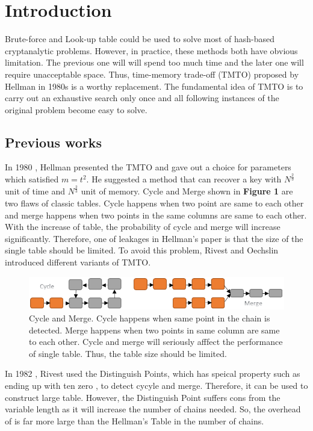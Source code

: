 \documentclass[runningheads,a4paper]{llncs}
\begin{document}
\section{Introduction}

Brute-force and Look-up table \cite{borst1998time} could be used to solve most of hash-based \cite{rogaway2004cryptographic} cryptanalytic problems. However, in practice, these methods both have obvious limitation. The previous one will  will spend too much time and the later one will require unacceptable space. Thus, time-memory trade-off (TMTO) proposed by Hellman in 1980s \cite{hellman1980cryptanalytic} is a worthy replacement. The fundamental idea of TMTO is to carry out an exhaustive search only once and all following instances of the original problem become easy to solve.

\subsection{Previous works}

In 1980 \cite{hellman1980cryptanalytic}, Hellman presented the TMTO and gave out a choice for parameters which satisfied $m = t^2$. He suggested a method that can recover a key with $N^{\frac{2}{3}}$ unit of time and $N^{\frac{2}{3}}$ unit of memory. Cycle and Merge \cite{quisquater1990easy} shown in \textbf{Figure 1} are two flaws of classic tables. Cycle happens when two point are same to each other and merge happens when two points in the same columns are same to each other. With the increase of table, the probability of cycle and merge will increase significantly. Therefore, one of leakages in Hellman's paper is that the size of the single table should be limited. To avoid this problem, Rivest and Oechslin introduced different variants of TMTO. 

\begin{figure}
\includegraphics[width=\linewidth]{graph1}
\caption{Cycle and Merge. Cycle happens when same point in the chain is detected. Merge happens when two points in same column are same to each other. Cycle and merge will seriously afffect the performance of single table. Thus, the table size should be limited. }
\label{Figure 1}
\end{figure}

In 1982 \cite{rivest1978method} \cite{standaert2003time}, Rivest used the Distinguish Points, which has speical property such as ending up with ten zero , to detect cycyle and merge. Therefore, it can be used to construct large table. However, the Distinguish Point suffers cons from the variable length as it will increase the number of chains needed. So, the overhead of is far more large than the Hellman's Table in the number of chains.
\end{document}
